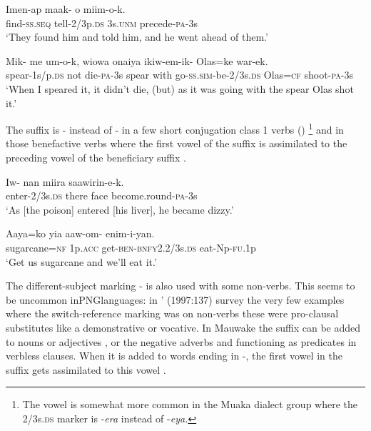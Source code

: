 \ea%
\label{ex:3:x244}
\gll Imen-ap maak- o miim-o-k. \\
find-\textsc{ss}.\textsc{seq} tell-2/3p.\textsc{ds} 3s.\textsc{unm} precede-\textsc{pa}-3s \\
\glt`They found him and told him, and he went ahead of them.' 
\z

\ea%
\label{ex:3:x245}
\gll Mik- me um-o-k, wiowa onaiya ikiw-em-ik- Olas=ke war-ek.\\
spear-1s/p.\textsc{ds} not die-\textsc{pa}-3s spear with go-\textsc{ss}.\textsc{sim}-be-2/3s.\textsc{ds} Olas=\textsc{cf} shoot-\textsc{pa}-3s\\
\glt`When I speared it, it didn't die, (but) as it was going with the spear Olas shot it.'
\z

The suffix is - instead of \nobreakdash- in a few short conjugation class 1 verbs () \footnote{The vowel  is somewhat more common in the Muaka dialect group where the 2/3s.\textsc{ds} marker is -\textit{era} instead of \nobreakdash-\textit{eya.}} and in those benefactive verbs where the first vowel of the suffix is assimilated to the preceding vowel of the beneficiary suffix . 

\ea%
\label{ex:3:x493}
\gll Iw- nan miira saawirin-e-k. \\
enter-2/3s.\textsc{ds} there face become.round-\textsc{pa}-3s\\
\glt`As [the poison] entered [his liver], he became dizzy.'
\z

\ea%
\label{ex:3:x695}
\gll Aaya=ko yia aaw-om- enim-i-yan. \\
sugarcane=\textsc{nf} 1p.\textsc{acc} get-\textsc{ben}-\textsc{bnfy}2.2/3s.\textsc{ds} eat-Np-\textsc{fu}.1p\\
\glt`Get us sugarcane and we'll eat it.'
\z

The different-subject marking \nobreakdash- is also used with some non-verbs. This seems to be uncommon in\textsc{PNG}languages: in \citeauthor{Roberts1997}' (1997:137) survey the very few examples where the switch-reference marking was on non-verbs these were pro-clausal substitutes like a demonstrative or vocative. In Mauwake the  suffix can be added to nouns  or adjectives , or the negative adverbs  and   functioning as predicates in verbless clauses. When it is added to words ending in -, the first vowel in the suffix gets assimilated to this vowel .

